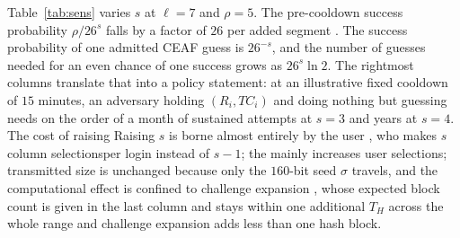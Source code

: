 \documentclass[cmc,article,submit,moreauthors,pdftex]{Definitions/tsp}
\providecommand{\DIFadd}[1]{{\protect\color{blue} \sf #1}} %
\providecommand{\DIFdel}[1]{{\protect\color{red} \scriptsize #1}} %
\providecommand{\DIFaddbegin}{} %
\providecommand{\DIFaddend}{} %
\providecommand{\DIFdelbegin}{} %
\providecommand{\DIFdelend}{} %
\begin{document}
Table~\ref{tab:sens} varies $s$ at $\ell=7$\DIFdelbegin \DIFdel{and $\rho=5$. The pre-cooldown success probability $\rho/26^{s}$ falls by a factor of $26$ per added segment}\DIFdelend \DIFaddbegin \DIFadd{. The success probability of one admitted CEAF guess is $26^{-s}$}\DIFaddend , and the number of guesses needed for an even chance of one success grows as $26^{s}\ln 2$. \DIFdelbegin \DIFdel{The rightmost columns translate that into a policy statement: at an illustrative fixed cooldown of $15$ minutes, an adversary holding $(R_i,TC_i)$ and doing nothing but guessing needs on the order of a month of sustained attempts at $s=3$ and years at $s=4$. The cost of raising }\DIFdelend \DIFaddbegin \DIFadd{Raising }\DIFaddend $s$ \DIFdelbegin \DIFdel{is borne almost entirely by the user , who makes $s$ column selectionsper login instead of $s-1$; the }\DIFdelend \DIFaddbegin \DIFadd{mainly increases user selections; }\DIFaddend transmitted size is unchanged \DIFdelbegin \DIFdel{because only the $160$-bit seed $\sigma$ travels, and the computational effect is confined to challenge expansion , whose expected block count is given in the last column and stays within one additional $T_H$ across the whole range}\DIFdelend \DIFaddbegin \DIFadd{and challenge expansion adds less than one hash block}\DIFaddend .
\end{document}
